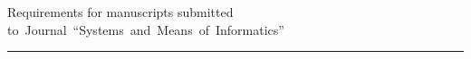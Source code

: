 \def\stat{prav-eng}


{%


\vspace*{-25pt} %


\raggedleft\large \bf%


Requirements for manuscripts submitted to~Journal~``Systems~and~Means~of~Informatics''




\vskip 5pt


    \hrule


    \par




}





\def\rightmark{\ }


\def\leftmark{\ }





\def\tit{\ }





\def\aut{\ }





\def\auf{\ }





\def\leftkol{\ } %





\def\rightkol{\ } %





\titele{\tit}{\aut}{\auf}{\leftkol}{\rightkol}





\vspace*{-64pt}


